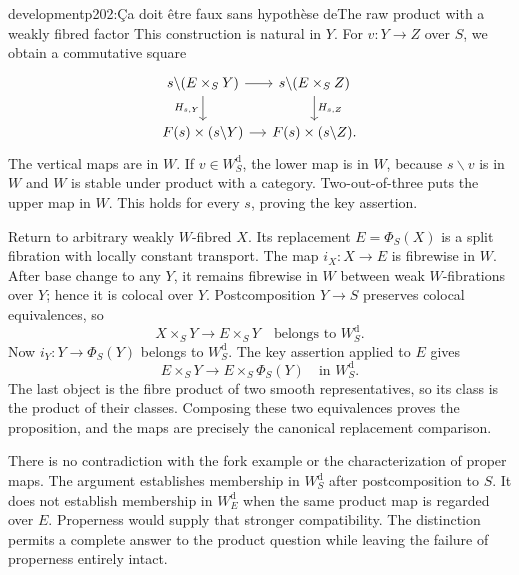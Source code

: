 \begin{dcomment}{development}{p202:Ça doit être faux sans hypothèse de}{The raw product with a weakly fibred factor}
This construction is natural in $Y$. For $v:Y\to Z$ over $S$, we obtain a commutative square
\[
\begin{tikzcd}[column sep=small]
s\backslash(E\times_S Y)\arrow[r]\arrow[d,"H_{s,Y}"']&
s\backslash(E\times_S Z)\arrow[d,"H_{s,Z}"]\\
F(s)\times(s\backslash Y)\arrow[r]&F(s)\times(s\backslash Z).
\end{tikzcd}
\]
The vertical maps are in $W$. If $v\in W_S^{\mathrm d}$, the lower map is in $W$, because $s\backslash v$ is in $W$ and $W$ is stable under product with a category. Two-out-of-three puts the upper map in $W$. This holds for every $s$, proving the key assertion.

Return to arbitrary weakly $W$-fibred $X$. Its replacement $E=\Phi_S(X)$ is a split fibration with locally constant transport. The map $i_X:X\to E$ is fibrewise in $W$. After base change to any $Y$, it remains fibrewise in $W$ between weak $W$-fibrations over $Y$; hence it is colocal over $Y$. Postcomposition $Y\to S$ preserves colocal equivalences, so
\[
X\times_S Y\longrightarrow E\times_S Y
\quad\text{belongs to }W_S^{\mathrm d}.
\]
Now $i_Y:Y\to\Phi_S(Y)$ belongs to $W_S^{\mathrm d}$. The key assertion applied to $E$ gives
\[
E\times_S Y\longrightarrow E\times_S\Phi_S(Y)
\quad\text{in }W_S^{\mathrm d}.
\]
The last object is the fibre product of two smooth representatives, so its class is the product of their classes. Composing these two equivalences proves the proposition, and the maps are precisely the canonical replacement comparison.

There is no contradiction with the fork example or the characterization of proper maps. The argument establishes membership in $W_S^{\mathrm d}$ after postcomposition to $S$. It does not establish membership in $W_E^{\mathrm d}$ when the same product map is regarded over $E$. Properness would supply that stronger compatibility. The distinction permits a complete answer to the product question while leaving the failure of properness entirely intact.
\end{dcomment}

